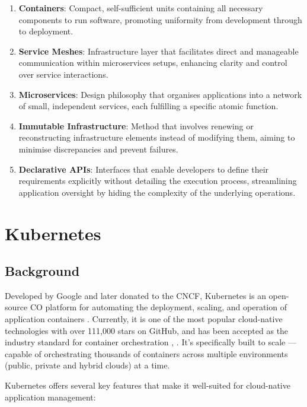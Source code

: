 \begin{enumerate}
\item
  \textbf{Containers}: Compact, self-sufficient units containing all necessary components to run software, promoting uniformity from development through to deployment.
\item
  \textbf{Service Meshes}: Infrastructure layer that facilitates direct and manageable communication within microservices setups, enhancing clarity and control over service interactions.
\item
  \textbf{Microservices}: Design philosophy that organises applications into a network of small, independent services, each fulfilling a specific atomic function.
\item
  \textbf{Immutable Infrastructure}: Method that involves renewing or reconstructing infrastructure elements instead of modifying them, aiming to minimise discrepancies and prevent failures.
\item
  \textbf{Declarative APIs}: Interfaces that enable developers to define their requirements explicitly without detailing the execution process, streamlining application oversight by hiding the complexity of the underlying operations.
\end{enumerate}

\section{Kubernetes}
\subsection{Background}

Developed by Google and later donated to the CNCF, Kubernetes is an open-source CO platform for automating the deployment, scaling, and operation of application containers \cite{noauthor_kubernetes_nodate}. Currently, it is one of the most popular cloud-native technologies with over 111,000 stars on GitHub, and has been accepted as the industry standard for container orchestration \cite{truyen_comprehensive_2019}, \cite{noauthor_kuberneteskubernetes_nodate}. It's specifically built to scale — capable of orchestrating thousands of containers across multiple environments (public, private and hybrid clouds) at a time.

Kubernetes offers several key features that make it well-suited for cloud-native application management:

